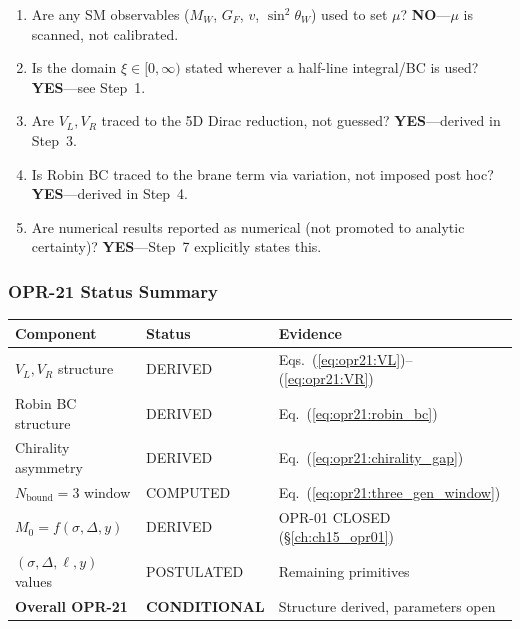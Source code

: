 \begin{tcolorbox}[colback=red!5!white, colframe=red!50!black,
    title=\textbf{No-Smuggling Checklist (OPR-21)}]
\label{box:opr21_no_smuggling}

\begin{enumerate}[nosep]
    \item[$\checkmark$] Are any SM observables ($M_W$, $G_F$, $v$, $\sin^2\theta_W$)
          used to set $\mu$? \textbf{NO}---$\mu$ is scanned, not calibrated.

    \item[$\checkmark$] Is the domain $\xi \in [0, \infty)$ stated wherever a
          half-line integral/BC is used? \textbf{YES}---see Step~1.

    \item[$\checkmark$] Are $V_L, V_R$ traced to the 5D Dirac reduction, not guessed?
          \textbf{YES}---derived in Step~3.

    \item[$\checkmark$] Is Robin BC traced to the brane term via variation, not
          imposed post hoc? \textbf{YES}---derived in Step~4.

    \item[$\checkmark$] Are numerical results reported as numerical (not promoted
          to analytic certainty)? \textbf{YES}---Step~7 explicitly states this.
\end{enumerate}
\end{tcolorbox}

\subsubsection{OPR-21 Status Summary}
\label{subsubsec:opr21_status_summary}

\begin{center}
\begin{tabular}{lll}
\toprule
\textbf{Component} & \textbf{Status} & \textbf{Evidence} \\
\midrule
$V_L, V_R$ structure & DERIVED \tagDc{} & Eqs.~(\ref{eq:opr21:VL})--(\ref{eq:opr21:VR}) \\
Robin BC structure & DERIVED \tagDc{} & Eq.~(\ref{eq:opr21:robin_bc}) \\
Chirality asymmetry & DERIVED \tagDc{} & Eq.~(\ref{eq:opr21:chirality_gap}) \\
$N_{\text{bound}} = 3$ window & COMPUTED & Eq.~(\ref{eq:opr21:three_gen_window}) \\
$M_0 = f(\sigma, \Delta, y)$ & \tagDc{} DERIVED & OPR-01 CLOSED (\S\ref{ch:ch15_opr01}) \\
$(\sigma, \Delta, \ell, y)$ values & \tagP{} POSTULATED & Remaining primitives \\
\midrule
\textbf{Overall OPR-21} & \textbf{CONDITIONAL} \tagDc{} & Structure derived, parameters open \\
\bottomrule
\end{tabular}
\end{center}

